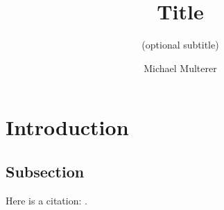 \documentclass[]{finalproject}
\title{Title}
\subtitle{(optional subtitle)}
\author{Michael Multerer}
\begin{document}
\maketitle

\section{Introduction} \label{introduction}
\subsection{Subsection}
Here is a citation: \cite{lamport86latex}.


\clearpage


\end{document}
